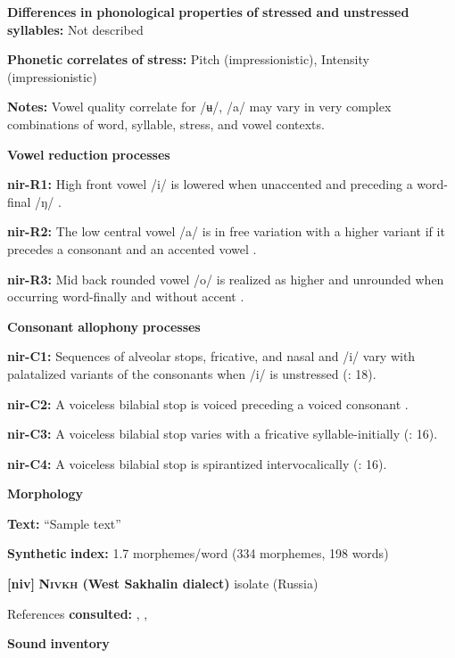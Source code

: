 \textbf{Differences} \textbf{in} \textbf{phonological} \textbf{properties} \textbf{of} \textbf{stressed} \textbf{and} \textbf{unstressed} \textbf{syllables:} Not described

\textbf{Phonetic} \textbf{correlates} \textbf{of} \textbf{stress:} Pitch (impressionistic), Intensity (impressionistic)

\textbf{Notes:} Vowel quality correlate for /ʉ/, /a/ may vary in very complex combinations of word, syllable, stress, and vowel contexts.

\textbf{Vowel} \textbf{reduction} \textbf{processes}

\textbf{nir-R1:} High front vowel /i/ is lowered when unaccented and preceding a word-final /ŋ/ \citep[10]{Anceaux1965}.

\textbf{nir-R2:} The low central vowel /a/ is in free variation with a higher variant if it precedes a consonant and an accented vowel \citep[13]{Anceaux1965}.

\textbf{nir-R3:} Mid back rounded vowel /o/ is realized as higher and unrounded when occurring word-finally and without accent \citep[14]{Anceaux1965}.

\textbf{Consonant} \textbf{allophony} \textbf{processes}

\textbf{nir-C1:} Sequences of alveolar stops, fricative, and nasal and /i/ vary with palatalized variants of the consonants when /i/ is unstressed (\citealt{MayMay1981}: 18).

\textbf{nir-C2:} A voiceless bilabial stop is voiced preceding a voiced consonant \citep[30]{May1997}.

\textbf{nir-C3:} A voiceless bilabial stop varies with a fricative syllable-initially (\citealt{MayMay1981}: 16).

\textbf{nir-C4:} A voiceless bilabial stop is spirantized intervocalically (\citealt{MayMay1981}: 16).

\textbf{Morphology}

\textbf{Text:} “Sample text” \citep[172-177]{May1997}

\textbf{Synthetic} \textbf{index:} 1.7 morphemes/word (334 morphemes, 198 words)

\textbf{[niv]}   \textbf{\textsc{Nivkh} \textbf{(West} \textbf{Sakhalin} \textbf{dialect)}}  isolate (Russia)

References \textbf{consulted:} \citet{Gruzdeva1998}, \citet{Kreinovich1979}, \citet{Shiraishi2006}

\textbf{Sound} \textbf{inventory}

